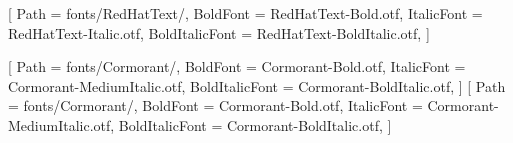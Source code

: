 \setsansfont{RedHatText-Regular.otf}[
  Path             = fonts/RedHatText/,
  BoldFont         = RedHatText-Bold.otf,
  ItalicFont       = RedHatText-Italic.otf,
  BoldItalicFont   = RedHatText-BoldItalic.otf,
]
\renewcommand{\familydefault}{\sfdefault}

%
%
%
\setmainfont{Cormorant-Medium.otf}[
  Path             = fonts/Cormorant/,
  BoldFont         = Cormorant-Bold.otf,
  ItalicFont       = Cormorant-MediumItalic.otf,
  BoldItalicFont   = Cormorant-BoldItalic.otf,
]
\newfontfamily{}[
  Path             = fonts/Cormorant/,
  BoldFont         = Cormorant-Bold.otf,
  ItalicFont       = Cormorant-MediumItalic.otf,
  BoldItalicFont   = Cormorant-BoldItalic.otf,
]

